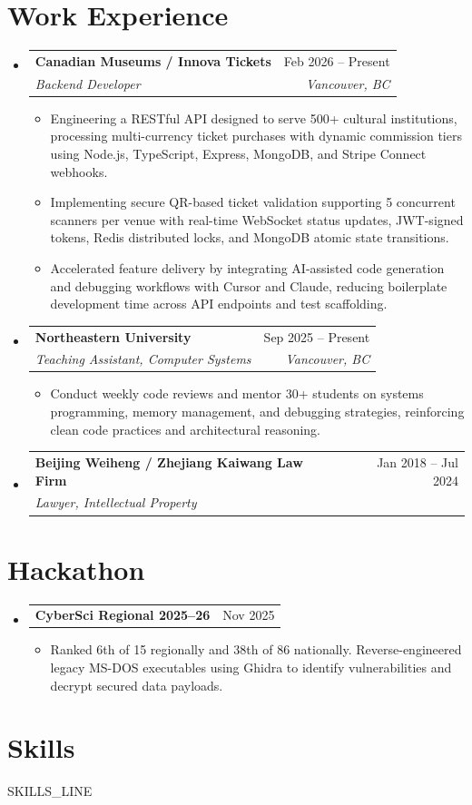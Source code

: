 \documentclass[letterpaper,11pt]{article}
\makeatletter
\newcommand{\resumeItem}[1]{\item\small{#1 \vspace{-2pt}}}
\newcommand{\resumeSubheading}[4]{
  \vspace{-2pt}\item
    \begin{tabular*}{0.97\textwidth}[t]{l@{\extracolsep{\fill}}r}
      \textbf{#1} & #2 \\
      \textit{\small#3} & \textit{\small #4} \\
    \end{tabular*}\vspace{-7pt}
}
\newcommand{\resumeProjectHeading}[2]{
    \item
    \begin{tabular*}{0.97\textwidth}{l@{\extracolsep{\fill}}r}
      \small#1 & #2 \\
    \end{tabular*}\vspace{-7pt}
}
\newcommand{\resumeSubHeadingListStart}{\begin{itemize}[leftmargin=0.15in, label={}]}
\newcommand{\resumeSubHeadingListEnd}{\end{itemize}}
\newcommand{\resumeItemListStart}{\begin{itemize}}
\newcommand{\resumeItemListEnd}{\end{itemize}\vspace{-5pt}}
\makeatother
\begin{document}
\section{Work Experience}
\resumeSubHeadingListStart
    \resumeSubheading
      {Canadian Museums / Innova Tickets}{Feb 2026 -- Present}
      {Backend Developer}{Vancouver, BC}
    \resumeItemListStart
        \resumeItem{Engineering a RESTful API designed to serve 500+ cultural institutions, processing multi-currency ticket purchases with dynamic commission tiers using Node.js, TypeScript, Express, MongoDB, and Stripe Connect webhooks.}
        \resumeItem{Implementing secure QR-based ticket validation supporting 5 concurrent scanners per venue with real-time WebSocket status updates, JWT-signed tokens, Redis distributed locks, and MongoDB atomic state transitions.}
        \resumeItem{Accelerated feature delivery by integrating AI-assisted code generation and debugging workflows with Cursor and Claude, reducing boilerplate development time across API endpoints and test scaffolding.}
    \resumeItemListEnd

    \resumeSubheading
      {Northeastern University}{Sep 2025 -- Present}
      {Teaching Assistant, Computer Systems}{Vancouver, BC}
    \resumeItemListStart
        \resumeItem{Conduct weekly code reviews and mentor 30+ students on systems programming, memory management, and debugging strategies, reinforcing clean code practices and architectural reasoning.}
    \resumeItemListEnd

    \resumeSubheading
      {Beijing Weiheng / Zhejiang Kaiwang Law Firm}{Jan 2018 -- Jul 2024}
      {Lawyer, Intellectual Property}{}
\resumeSubHeadingListEnd

\section{Hackathon}
\resumeSubHeadingListStart
    \resumeProjectHeading
      {\textbf{CyberSci Regional 2025--26}}{Nov 2025}
    \resumeItemListStart
        \resumeItem{Ranked 6th of 15 regionally and 38th of 86 nationally. Reverse-engineered legacy MS-DOS executables using Ghidra to identify vulnerabilities and decrypt secured data payloads.}
    \resumeItemListEnd
\resumeSubHeadingListEnd

\section{Skills}
\begin{itemize}[leftmargin=0.15in, label={}]
    \small{\item{
        {{SKILLS_LINE}}
    }}
\end{itemize}
\end{document}
